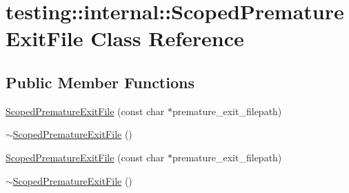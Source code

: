 \hypertarget{classtesting_1_1internal_1_1_scoped_premature_exit_file}{\section{testing\-:\-:internal\-:\-:Scoped\-Premature\-Exit\-File Class Reference}
\label{classtesting_1_1internal_1_1_scoped_premature_exit_file}
}
\subsection*{Public Member Functions}
\begin{DoxyCompactItemize}
\item 
\hyperlink{classtesting_1_1internal_1_1_scoped_premature_exit_file_ae520883b8a6984a864ce675acedff4a2}{Scoped\-Premature\-Exit\-File} (const char $\ast$premature\-\_\-exit\-\_\-filepath)
\item 
\hyperlink{classtesting_1_1internal_1_1_scoped_premature_exit_file_afa2ddc9bc1c2a90fd0dd82bb11fddc79}{$\sim$\-Scoped\-Premature\-Exit\-File} ()
\item 
\hyperlink{classtesting_1_1internal_1_1_scoped_premature_exit_file_ae520883b8a6984a864ce675acedff4a2}{Scoped\-Premature\-Exit\-File} (const char $\ast$premature\-\_\-exit\-\_\-filepath)
\item 
\hyperlink{classtesting_1_1internal_1_1_scoped_premature_exit_file_afa2ddc9bc1c2a90fd0dd82bb11fddc79}{$\sim$\-Scoped\-Premature\-Exit\-File} ()
\end{DoxyCompactItemize}


